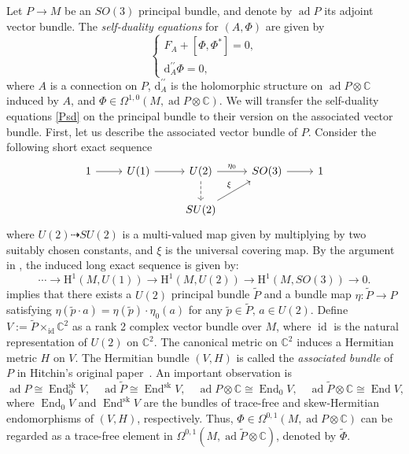 \documentclass[a4paper]{amsart}
\theoremstyle{definition}
\theoremstyle{remark}
\numberwithin{equation}{section}
\begin{document}
Let $P \to M$ be an $SO(3)$ principal bundle, and denote by $\operatorname{ad} P$ its adjoint vector bundle. The \textit{self-duality equations} for $(A, \Phi)$ are given by  
\begin{equation}
\begin{cases}
F_A + [\Phi, \Phi^*] = 0, \\
\mathrm{d}_A^{\prime\prime} \Phi = 0,
\end{cases}\label{Psd}
\end{equation}
where $A$ is a connection on $P$, $\mathrm{d}_A^{\prime\prime}$ is the holomorphic structure on $\operatorname{ad} P\otimes\mathbb{C}$ induced by $A$, and $\Phi \in \Omega^{1,0}(M, \operatorname{ad} P \otimes \mathbb{C})$. We will transfer the self-duality equations \eqref{Psd} on the principal bundle to their version on the associated vector bundle. First, let us describe the associated vector bundle of $P$. Consider the following short exact sequence 
\[
\begin{tikzcd}
1 \arrow[r] & U(1) \arrow[r] & U(2) \arrow[r, "\eta_0"] \arrow[d, dashed] & SO(3) \arrow[r] & 1 \\
            &                & SU(2) \arrow[ur, "\xi"]
\end{tikzcd}
\]
where $U(2) \dashrightarrow SU(2)$ is a multi-valued map given by multiplying by two suitably chosen constants, and $\xi$ is the universal covering map. By the argument in \cite[Appendix A, p. 373]{lawson1989spin}, the induced long exact sequence is given by:
\[
\cdots \to \mathrm{H}^1(M, U(1)) \to \mathrm{H}^1(M, U(2)) \to \mathrm{H}^1(M, SO(3)) \to 0.
\]
implies that there exists a $U(2)$ principal bundle $\tilde{P}$ and a bundle map $\eta: \tilde{P} \to P$ satisfying $\eta(\tilde{p} \cdot a) = \eta(\tilde{p}) \cdot \eta_0(a)$ for any $\tilde{p} \in \tilde{P}, \, a \in U(2).$ Define $V := \tilde{P} \times_{\operatorname{id}} \mathbb{C}^2$ as a rank 2 complex vector bundle over $M$, where $\operatorname{id}$ is the natural representation of $U(2)$ on $\mathbb{C}^2$. The canonical metric on $\mathbb{C}^2$ induces a Hermitian metric $H$ on $V$. The Hermitian bundle $(V, H)$ is called the \textit{associated bundle} of $P$ in Hitchin's original paper~\cite[Section~2]{hitchin1987self}. An important observation is
\[
\operatorname{ad} P \cong \operatorname{End}_0^{\text{sk}} V, \quad \operatorname{ad} \tilde{P} \cong \operatorname{End}^{\text{sk}} V, \quad \operatorname{ad} P \otimes \mathbb{C} \cong \operatorname{End}_0 V, \quad \operatorname{ad} \tilde{P} \otimes \mathbb{C} \cong \operatorname{End} V,
\]
where $\operatorname{End}_0 V$ and $\operatorname{End}^{\text{sk}} V$ are the bundles of trace-free and skew-Hermitian endomorphisms of $(V, H)$, respectively. Thus, $\Phi \in \Omega^{0,1}(M, \operatorname{ad} P \otimes \mathbb{C})$ can be regarded as a trace-free element in $\Omega^{0,1}(M, \operatorname{ad} \tilde{P} \otimes \mathbb{C})$, denoted by $\tilde \Phi$.
\end{document}

